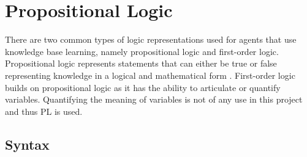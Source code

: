 

\section{Propositional Logic}


There are two common types of logic representations used for agents that use knowledge base learning, namely propositional logic and first-order logic. Propositional logic  represents statements that can either be true or false representing knowledge in a logical and mathematical form \cite{Logic}. First-order logic builds on propositional logic as it has the ability to articulate or quantify variables. Quantifying the meaning of variables is not of any use in this project and thus PL is used.



\subsection{Syntax}




